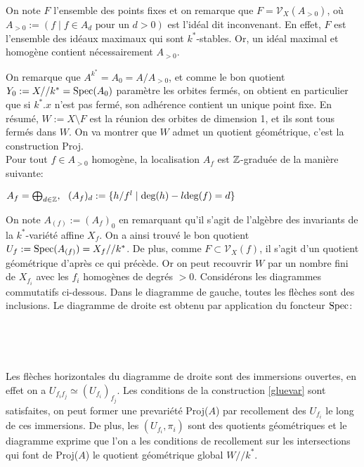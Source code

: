 On note $F$ l'ensemble des points fixes et on remarque que $F=\mathcal{V}_X(A_{>0})$, où $A_{>0}:=(f\mid f\in A_d \textrm{ pour un }d>0)$ est l'idéal dit inconvenant. En effet, $F$ est l'ensemble des idéaux maximaux qui sont $k^*$-stables. Or, un idéal maximal et homogène contient nécessairement $A_{>0}$.

On remarque que $A^{k^*}=A_0=A/A_{>0}$, et comme le bon quotient $Y_0:=X//k^*=\operatorname{Spec} (A_0)$ paramètre les orbites fermés, on obtient en particulier que si $k^*.x$ n'est pas fermé, son adhérence contient un unique point fixe. En résumé, $W:=X\setminus F$ est la réunion des orbites de dimension 1, et ils sont tous fermés dans $W$. On va montrer que $W$ admet un quotient géométrique, c'est la construction Proj.\\
Pour tout $f\in A_{>0}$ homogène, la localisation $A_f$ est $\mathbb{Z}$-graduée de la manière suivante:
\begin{center}
 $A_f=\bigoplus_{d\in \mathbb{Z}},\,\,\,\, (A_f)_d:=\lbrace h/f^l\mid \textrm{deg}(h)-l\textrm{deg}(f)=d \rbrace$
\end{center}
On note $A_{(f)}:=(A_f)_0$ en remarquant qu'il s'agit de l'algèbre des invariants de la $k^*$-variété affine $X_f$. On a ainsi trouvé le bon quotient $U_f:=\operatorname{Spec}(A_{(f)})=X_f//k^*$. De plus, comme $F\subset\mathcal{V}_X(f)$,  il s'agit d'un quotient géométrique d'après ce qui précède. Or on peut recouvrir $W$ par un nombre fini de $X_{f_i}$ avec les $f_i$ homogènes de degrés $>0$. Considérons les diagrammes commutatifs ci-dessous. Dans le diagramme de gauche, toutes les flèches sont des inclusions. Le diagramme de droite est obtenu par application du foncteur $\operatorname{Spec}$:
\begin{multicols}{2}
	\begin{center}
	\\
	\end{center}
	
	\columnbreak
	\begin{center}
	\\
	\end{center}
\end{multicols}
Les flèches horizontales du diagramme de droite sont des immersions ouvertes, en effet on a $U_{f_if_j}\simeq (U_{f_i})_{f_j}$. Les conditions de la construction \ref{gluevar} sont satisfaites, on peut former une prevariété Proj($A$) par recollement des $U_{f_i}$ le long de ces immersions. De plus, les $(U_{f_i},\pi_i)$ sont des quotients géométriques et le diagramme exprime que l'on a les conditions de recollement sur les intersections qui font de Proj($A$) le quotient géométrique global $W//k^*$.

